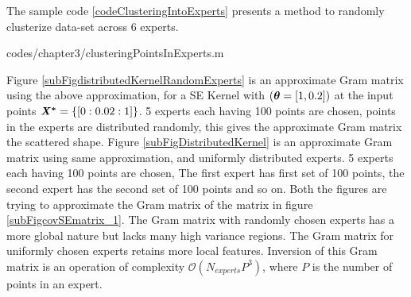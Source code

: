 The sample code \ref{codeClusteringIntoExperts} presents a method to randomly clusterize data-set across $6$ experts.
\begin{mdframed}[hidealllines=true,backgroundcolor=lightgray!20]

                    {codes/chapter3/clusteringPointsInExperts.m}
\end{mdframed}

Figure \ref{subFigdistributedKernelRandomExperts} is an approximate Gram matrix using the above approximation, for a SE Kernel with $(\boldsymbol{\theta} = [1, 0.2])$ at the input points $\bm{\mathit{X^{*}}} = \{[0:0.02:1]\}$. 5 experts each having 100 points are chosen, points in the experts are distributed randomly, this gives the approximate Gram matrix the scattered shape. Figure \ref{subFigDistributedKernel} is an approximate Gram matrix using same approximation, and uniformly distributed experts. 5 experts each having 100 points are chosen, The first expert has first set of 100 points, the second expert has the second set of 100 points and so on. Both the figures are trying to approximate the Gram matrix of the matrix in figure \ref{subFigcovSEmatrix_1}. The Gram matrix with randomly chosen experts has a more global nature but lacks many high variance regions. The Gram matrix for uniformly chosen experts retains more local features. Inversion of this Gram matrix is an operation of complexity $\mathcal{O}(N_{experts}P^{3})$, where $P$ is the number of points in an expert.

